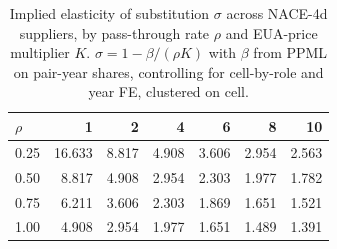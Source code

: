 \begin{table}[ht]
\centering
\caption{Implied elasticity of substitution $\sigma$ across NACE-4d suppliers, by pass-through rate $\rho$ and EUA-price multiplier $K$. $\sigma = 1 - \beta / (\rho K)$ with $\beta$ from PPML on pair-year shares, controlling for cell-by-role and year FE, clustered on cell.} 
\label{tab:phase4_within_intensive_ces_ppml_sigma_grid}
\begin{tabular}{lrrrrrr}
  \toprule
$\rho$ & 1 & 2 & 4 & 6 & 8 & 10 \\ 
  \midrule
0.25 & 16.633 & 8.817 & 4.908 & 3.606 & 2.954 & 2.563 \\ 
  0.50 & 8.817 & 4.908 & 2.954 & 2.303 & 1.977 & 1.782 \\ 
  0.75 & 6.211 & 3.606 & 2.303 & 1.869 & 1.651 & 1.521 \\ 
  1.00 & 4.908 & 2.954 & 1.977 & 1.651 & 1.489 & 1.391 \\ 
   \bottomrule
\end{tabular}
\end{table}
